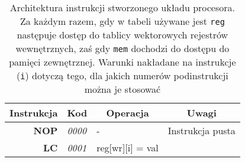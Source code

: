 \begin{landscape}
\begin{longtable}[c]{|r|l|l|l|}
\caption[Architektura instrukcji stworzonego układu procesora]{Architektura instrukcji stworzonego układu procesora. Za każdym razem, gdy w tabeli używane jest \texttt{reg} następuje dostęp do tablicy wektorowych rejestrów wewnętrznych, zaś gdy \texttt{mem} dochodzi do dostępu do pamięci zewnętrznej. Warunki nakładane na instrukcje (\texttt{i}) dotyczą tego, dla jakich numerów podinstrukcji można je stosować}
\label{ch3:tab:instructions}\\
\hline
\multicolumn{1}{|c|}{\textbf{Instrukcja}} & \multicolumn{1}{c|}{\textbf{Kod}} & \multicolumn{1}{c|}{\textbf{Operacja}}                                                                                                      & \multicolumn{1}{c|}{\textbf{Uwagi}}                                                                                                                                                                                                                                                                                                                                            \\ \hline
\endhead
%
\textbf{NOP}                              & \textit{0000}                     & -                                                                                                                                           & Instrukcja pusta                                                                                                                                                                                                                                                                                                                                                               \\ \hline
\textbf{LC}                               & \textit{0001}                     & reg{[}wr{]}{[}i{]} = val                                                                                                                    &                                                                                                                                                                                                                                                                                                                                                                                \\ \hline

\end{longtable}
\end{landscape}

